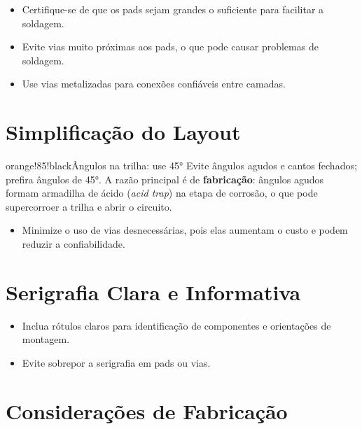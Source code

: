 \begin{itemize}
\tightlist
\item
  Certifique-se de que os pads sejam grandes o suficiente para facilitar a soldagem.
\item
  Evite vias muito próximas aos pads, o que pode causar problemas de soldagem.
\item
  Use vias metalizadas para conexões confiáveis entre camadas.
\end{itemize}

\hypertarget{simplificauxe7uxe3o-do-layout}{%
\section{Simplificação do Layout}\label{simplificauxe7uxe3o-do-layout}}

\begin{quadro}{orange!85!black}{Ângulos na trilha: use 45°}
Evite ângulos agudos e cantos fechados; prefira ângulos de 45°. A razão
principal é de \textbf{fabricação}: ângulos agudos formam armadilha de
ácido (\emph{acid trap}) na etapa de corrosão, o que pode supercorroer a
trilha e abrir o circuito.
\end{quadro}

\begin{itemize}
\tightlist
\item
  Minimize o uso de vias desnecessárias, pois elas aumentam o custo e podem reduzir a confiabilidade.
\end{itemize}

\hypertarget{serigrafia-clara-e-informativa}{%
\section{Serigrafia Clara e Informativa}\label{serigrafia-clara-e-informativa}}

\begin{itemize}
\tightlist
\item
  Inclua rótulos claros para identificação de componentes e orientações de montagem.
\item
  Evite sobrepor a serigrafia em pads ou vias.
\end{itemize}

\hypertarget{considerauxe7uxf5es-de-fabricauxe7uxe3o}{%
\section{Considerações de Fabricação}\label{considerauxe7uxf5es-de-fabricauxe7uxe3o}}

